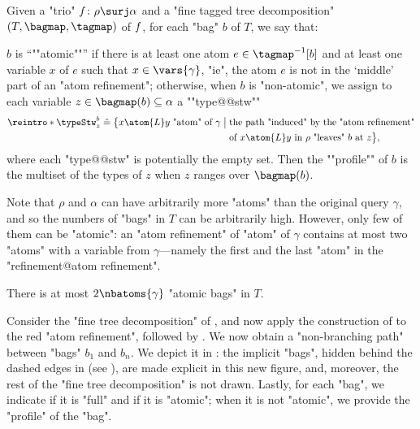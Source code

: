 \begin{definition}
    \AP Given a "trio" $\fun\colon \rho \surj \alpha$ and a "fine tagged tree decomposition"
    $(T, \bagmap, \tagmap)$ of $f$, for each "bag" $b$ of $T$, we say that:
    \begin{itemize}
        \itemAP $b$ is ``""atomic""'' if there is at least one atom $e \in \tagmap^{-1}[b]$ 
            and at least one variable $x$ of $e$ such that $x \in \vars{\gamma}$, "ie", the atom $e$ is not in the `middle' part of an "atom refinement";
        \itemAP otherwise, when $b$ is "non-atomic", we assign to each variable
            $z \in \bagmap(b) \subseteq \alpha$ a ""type@@stw""
            \begin{align*}
                \reintro*\typeStw_z^b \defeq
                \bigl\{ x \atom{L} y \text{ "atom" of $\gamma$} \;\big\vert\; {} &
                    \text{the path "induced" by the "atom refinement"} \\
                    &\text{of $x \atom{L} y$ in $\rho$ "leaves" $b$ at $z$}
                \bigr\},
            \end{align*}
			where each "type@@stw" is potentially the empty set.
            Then the ""profile"" of $b$ is the multiset of the types of $z$
            when $z$ ranges over $\bagmap(b)$.
    \end{itemize}
\end{definition}

Note that $\rho$ and $\alpha$ can have arbitrarily more "atoms" than the original query
$\gamma$, and so the numbers of "bags" in $T$ can be arbitrarily high. However,
only few of them can be "atomic": an "atom refinement" of "atom" of $\gamma$
contains at most two "atoms" with a variable from $\gamma$---namely the
first and the last "atom" in the "refinement@atom refinement".
\begin{fact}
	\AP\label{fact:bound-atomic-bags}
	There is at most $2 \nbatoms{\gamma}$ "atomic bags" in $T$.
\end{fact}


Consider the "fine tree decomposition" of , and now apply the construction of  to the red "atom refinement", followed by . We now obtain a "non-branching path"
between "bags" $b_1$ and $b_n$. We depict it in :
the implicit "bags", hidden behind the dashed edges in  (see ), are made explicit in this new figure, and, moreover, the rest of the "fine tree decomposition" is not drawn.
Lastly, for each "bag", we indicate if it is "full" and if it is "atomic"; when it is not "atomic", 
we provide the "profile" of the "bag".

